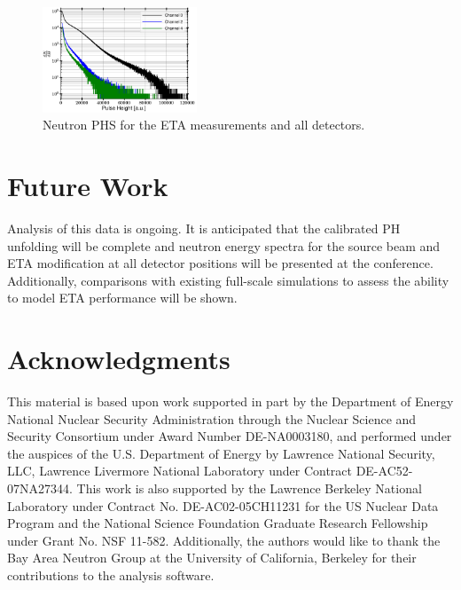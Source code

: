 \documentclass[twocolumn,10pt,final]{asme2ej}
\begin{document}
\vspace{-0.5 cm}
\begin{figure} [htp!]
 \centering
 \includegraphics[trim = 0cm 0cm 0cm 0cm, clip, width=0.41\textwidth]{../Figs/uncal-phs-allCh.png}
   \caption{Neutron PHS for the ETA measurements and all detectors.}
  \label{PHS}
\vspace{-0.4 cm}
\end{figure}

\vspace{-0.4 cm}
\section{Future Work} \label{sec:future-work}

Analysis of this data is ongoing.
It is anticipated that the calibrated PH unfolding will be complete and neutron energy spectra for the source beam and ETA modification at all detector positions will be presented at the conference.
Additionally, comparisons with existing full-scale simulations to assess the ability to model ETA performance will be shown. 


\vspace{-0.4 cm}
\section*{Acknowledgments}
This material is based upon work supported in part by the Department of Energy National Nuclear Security Administration through the Nuclear Science and Security Consortium under Award Number DE-NA0003180, and performed under the auspices of the U.S. Department of Energy by Lawrence National Security, LLC, Lawrence Livermore National Laboratory under Contract DE-AC52-07NA27344. 
This work is also supported by the Lawrence Berkeley National Laboratory under Contract No. DE-AC02-05CH11231 for the US Nuclear Data Program and the National Science Foundation Graduate Research Fellowship under Grant No. NSF 11-582.
Additionally, the authors would like to thank the Bay Area Neutron Group at the University of California, Berkeley for their contributions to the analysis software.
\end{document}

